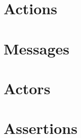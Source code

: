 \section{Actions}\label{sec:seq-metamodel-actions}


\section{Messages}\label{sec:metamodel-messages}


\section{Actors}\label{sec:metamodel-actors}


\section{Assertions}\label{sec:seq-metamodel-assertions}


